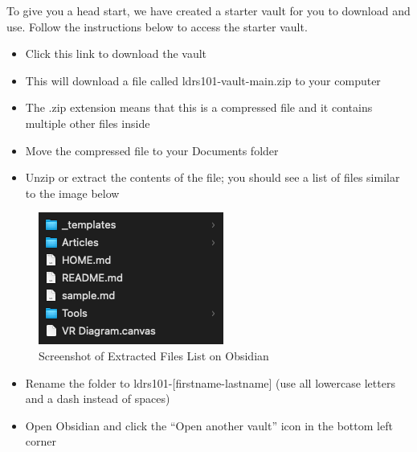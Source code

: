 \documentclass[
  letterpaper,
  DIV=11,
  numbers=noendperiod]{scrreprt}
\providecommand{\tightlist}{%
  \setlength{\itemsep}{0pt}\setlength{\parskip}{0pt}}\usepackage{longtable,booktabs,array}
\begin{document}
\begin{tcolorbox}[enhanced jigsaw, toprule=.15mm, colback=white, colframe=quarto-callout-note-color-frame, bottomtitle=1mm, leftrule=.75mm, coltitle=black, titlerule=0mm, rightrule=.15mm, colbacktitle=quarto-callout-note-color!10!white, left=2mm, title={Learning Activity}, opacitybacktitle=0.6, opacityback=0, breakable, toptitle=1mm, arc=.35mm, bottomrule=.15mm]

To give you a head start, we have created a starter vault for you to
download and use. Follow the instructions below to access the starter
vault.

\begin{itemize}
\tightlist
\item
  Click this link to download the vault
\item
  This will download a file called ldrs101-vault-main.zip to your
  computer
\item
  The .zip extension means that this is a compressed file and it
  contains multiple other files inside
\item
  Move the compressed file to your Documents folder
\item
  Unzip or extract the contents of the file; you should see a list of
  files similar to the image below
\end{itemize}

\begin{figure}[H]

\caption{\label{fig-image1}Screenshot of Extracted Files List on
Obsidian}

\includegraphics{assets/u1/vault-contents.png}

\end{figure}%

\begin{itemize}
\tightlist
\item
  Rename the folder to ldrs101-{[}firstname-lastname{]} (use all
  lowercase letters and a dash instead of spaces)
\item
  Open Obsidian and click the ``Open another vault'' icon in the bottom
  left corner
\end{itemize}


\end{tcolorbox}
\end{document}
